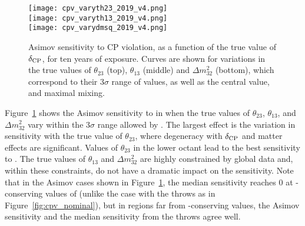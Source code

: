 \begin{figure}[htbp]
    \centering
    \texttt{[image: cpv\_varyth23\_2019\_v4.png]}\\
    \texttt{[image: cpv\_varyth13\_2019\_v4.png]}\\
    \texttt{[image: cpv\_varydmsq\_2019\_v4.png]}    
    \caption{Asimov sensitivity to CP violation, as a function of the true value of $\delta_{\rm CP}$, for ten years of exposure. Curves are shown for variations in the true values of $\theta_{23}$ (top), $\theta_{13}$ (middle) and $\Delta m^2_{32}$ (bottom), which correspond to their 3$\sigma$  range of values, as well as the  central value, and maximal mixing.}
    \label{fig:cpv_oa_var}
\end{figure}
Figure~\ref{fig:cpv_oa_var} shows the  Asimov sensitivity to  in  when the true values of $\theta_{23}$, $\theta_{13}$, and $\Delta m^{2}_{32}$ vary within the 3$\sigma$ range allowed by . The largest effect is the variation in sensitivity with the true value of $\theta_{23}$, where degeneracy with $\delta_{\rm CP}$ and matter effects are significant. Values of $\theta_{23}$ in the lower octant lead to the best sensitivity to . The true values of $\theta_{13}$ and $\Delta m^2_{32}$ are highly constrained by global data and, within these constraints, do not have a dramatic impact on the sensitivity.
Note that in the Asimov cases shown in Figure~\ref{fig:cpv_oa_var}, the median sensitivity reaches 0 at -conserving values of \deltacp (unlike the case with the throws as in Figure~\ref{fig:cpv_nominal}), but in regions far from -conserving values, the Asimov sensitivity and the median sensitivity from the throws agree well.


